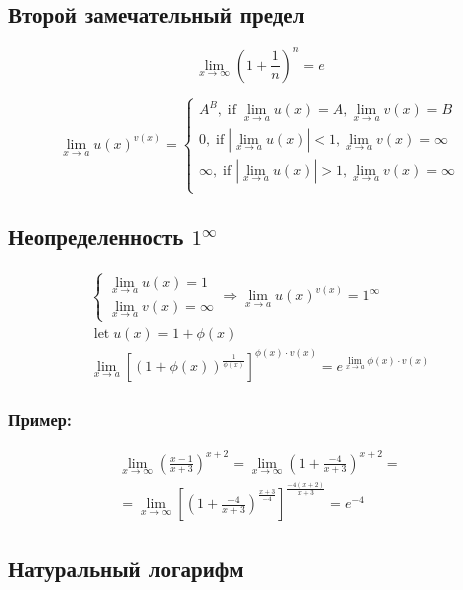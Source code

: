 \documentclass{article}
\DeclareMathOperator*{\Let}{let}
\DeclareMathOperator*{\If}{if}
\begin{document}
\subsection{Второй замечательный предел}

\[
\lim_{x \to \infty} (1 + \frac{1}{n})^{n} = e
\]

\[
\lim_{x \to a} u(x)^{v(x)} = \begin{cases}
	A^B, \If \lim_{x \to a} u(x) = A, \lim_{x \to a} v(x) = B \\
	0, \If |\lim_{x \to a} u(x)| < 1, \lim_{x \to a} v(x) = \infty \\
	\infty, \If |\lim_{x \to a} u(x)| > 1, \lim_{x \to a} v(x) = \infty \\ 
\end{cases}
\]

\subsection{Неопределенность $1^\infty$}

\begin{gather*}
	\begin{cases}
		\lim_{x \to a} u(x) = 1 \\
		\lim_{x \to a} v(x) = \infty
	\end{cases} \Rightarrow \lim_{x \to a} u(x)^{v(x)} = 1^\infty \\
	\Let u(x) = 1 + \phi(x) \\
	\lim_{x \to a} \left[ (1 + \phi(x))^{\frac{1}{\phi(x)}} \right]^{\phi(x) \cdot v(x)} =
	e^{\lim_{x \to a} \phi(x) \cdot v(x)}
\end{gather*}

\subsubsection*{Пример:}

\begin{gather*}
	\lim_{x \to \infty} \left( \frac{x - 1}{x + 3} \right)^{x+2} =
	\lim_{x \to \infty} \left( 1 + \frac{-4}{x + 3} \right)^{x+2} = \\
	= \lim_{x \to \infty} \left[ \left( 1 + \frac{-4}{x + 3} \right)
	^{\frac{x + 3}{-4}} \right]^{\frac{-4(x + 2)}{x + 3}} = e^{-4}
\end{gather*}

\subsection{Натуральный логарифм}
\end{document}
